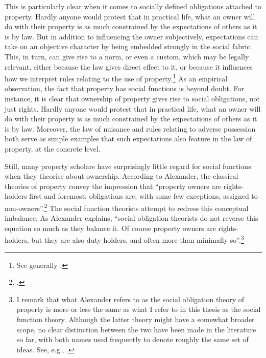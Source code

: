 {{This is particularly clear when it comes to socially defined obligations attached to property. Hardly anyone would protest that in practical life, what an owner will do with their property is as much constrained by the expectations of others as it is by law. But in addition to influencing the owner subjectively, expectations can take on an objective character by being embedded strongly in the social fabric. This, in turn, can give rise to a norm, or even a custom, which may be legally relevant, either because the law gives direct effect to it, or because it influences how we interpret rules relating to the use of property.\footnote{See generally \cite{penalver09,alexander09}.}
}
}
As an empirical observation, the fact that property has social functions is beyond doubt. For instance, it is clear that ownership of property gives rise to social obligations, not just rights. Hardly anyone would protest that in practical life, what an owner will do with their property is as much constrained by the expectations of others as it is by law. Moreover, the law of nuisance and rules relating to adverse possession both serve as simple examples that such expectations also feature in the law of property, at the concrete level. 

Still, many property scholars have surprisingly little regard for social functions when they theorise about ownership. According to Alexander, the classical theories of property convey the impression that ``property owners are rights-holders first and foremost; obligations are, with some few exceptions, assigned to non-owners''.\footcite[1023]{alexander11} The social function theorists attempt to redress this conceptual imbalance. As Alexander explains, ``social obligation theorists do not reverse this equation so much as they balance it. Of course property owners are rights-holders, but they are also duty-holders, and often more than minimally so''.\footnote{\cite[1023]{alexander11} I remark that what Alexander refers to as the social obligation theory of property is more or less the same as what I refer to in this thesis as the social function theory. Although the latter theory might have a somewhat broader scope, no clear distinction between the two have been made in the literature so far, with both names used frequently to denote roughly the same set of ideas. See, e.g., \cite{...}.}


